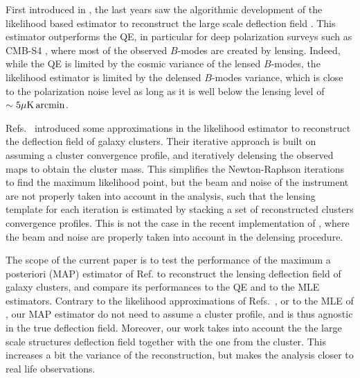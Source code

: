 \documentclass[prd, superscriptaddress, tightenlines, longbibliography, nofootinbib, eqsecnum, amsfonts, amsmath, floatfix, twocolumn, notitlepage]{revtex4-2}
\newcommand{\JC}[1]{\color{purple}{{JC:#1}}\color{black}\xspace}
\newcommand{\LL}[1]{{\color{orange}{LL: #1}}}
\begin{document}
First introduced in \cite{Hirata:2002jy, Hirata:2003ka}, the last years saw the algorithmic development of the likelihood based estimator to reconstruct the large scale deflection field \cite{Carron:2017mqf,Millea:2017fyd,Millea:2020cpw, Millea:2021had,Legrand:2021qdu,Aurlien:2022tlp,Legrand:2023jne,Reinecke:2023gtp}.
This estimator outperforms the QE, in particular for deep polarization surveys such as CMB-S4 \cite{CMB-S4:2016ple}, where most of the observed $B$-modes are created by lensing. Indeed, while the QE is limited by the cosmic variance of the lensed $B$-modes, the likelihood estimator is limited by the delensed $B$-modes variance, which is close to the polarization noise level as long as it is well below the lensing level of $\sim 5\mu\rm K \, arcmin$. 

Refs.~\cite{ Yoo:2008bf, Yoo:2010jd} introduced some approximations in the likelihood estimator to reconstruct the deflection field of galaxy clusters. Their iterative approach is built on assuming a cluster convergence profile, and iteratively delensing the observed maps to obtain the cluster mass. This simplifies the Newton-Raphson iterations to find the maximum likelihood point, but the beam and noise of the instrument are not properly taken into account in the analysis, such that the lensing template for each iteration is estimated by stacking a set of reconstructed clusters convergence profiles. This is not the case in the recent implementation of \cite{Carron:2017mqf}, where the beam and noise are properly taken into account in the delensing procedure. 



The scope of the current paper is to test the performance of the maximum a posteriori (MAP) estimator of Ref. \cite{Carron:2017mqf} to reconstruct the lensing deflection field of galaxy clusters, and compare its performances to the QE and to the MLE estimators. 
Contrary to the likelihood approximations of Refs.~\cite{ Yoo:2008bf, Yoo:2010jd}, or to the MLE of \cite{Lewis:2005fq, Baxter:2014frs, Raghunathan:2017cle}, our MAP estimator do not need to assume a cluster profile, and is thus agnostic in the true deflection field. Moreover,  our work takes into account the the large scale structures deflection field together with the one from the cluster. This increases a bit the variance of the reconstruction, but makes the analysis closer to real life observations. 
\end{document}
